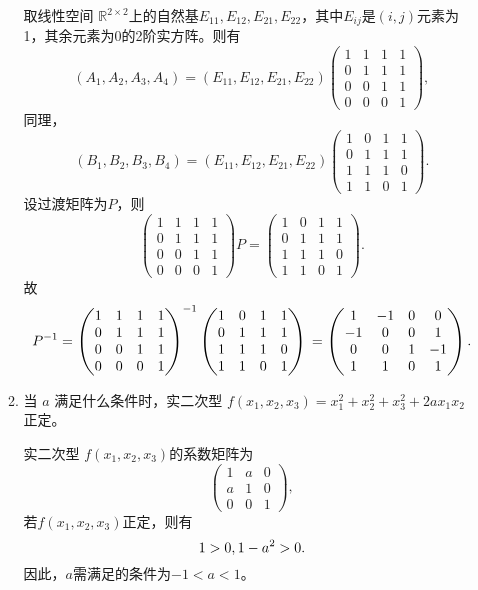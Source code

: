 \begin{enumerate}[1~]
\begin{enumerate}[1.~]
\begin{solution}
取线性空间 $\mathbb{R}^{2\times2}$上的自然基$E_{11}, E_{12}, E_{21}, E_{22}$，其中$E_{ij}$是$(i,j)$元素为1，其余元素为0的2阶实方阵。则有\[
(A_1, A_2, A_3, A_4) = (E_{11}, E_{12}, E_{21}, E_{22}) \left( \begin{matrix}
1& 1& 1& 1\\
0& 1& 1& 1\\
0& 0& 1& 1\\
0& 0& 0& 1
\end{matrix} \right),
\]
同理，\[
(B_1, B_2, B_3, B_4) = (E_{11}, E_{12}, E_{21}, E_{22}) \left( \begin{matrix}
1& 0& 1& 1\\
0& 1& 1& 1\\
1& 1& 1& 0\\
1& 1& 0& 1
\end{matrix} \right).
\]
设过渡矩阵为$P$，则\[
\left( \begin{matrix}
1& 1& 1& 1\\
0& 1& 1& 1\\
0& 0& 1& 1\\
0& 0& 0& 1
\end{matrix} \right) P = \left( \begin{matrix}
1& 0& 1& 1\\
0& 1& 1& 1\\
1& 1& 1& 0\\
1& 1& 0& 1
\end{matrix} \right).
\]
故\[
P^{-1} = \left( \begin{matrix}
1& 1& 1& 1\\
0& 1& 1& 1\\
0& 0& 1& 1\\
0& 0& 0& 1
\end{matrix} \right) ^{-1} \left( \begin{matrix}
1& 0& 1& 1\\
0& 1& 1& 1\\
1& 1& 1& 0\\
1& 1& 0& 1
\end{matrix} \right)\\
 = \left( \begin{matrix}
1& -1& 0& 0\\
-1& 0& 0& 1\\
0& 0& 1& -1\\
1& 1& 0& 1
\end{matrix} \right).
\]
\end{solution}
\item
当 $a$ 满足什么条件时，实二次型 $f(x_1, x_2, x_3) = x^2_1 + x^2_2 + x^2_3 + 2ax_1x_2$ 正定。
\begin{solution}
实二次型 $f(x_1, x_2, x_3)$的系数矩阵为
$$
\left( \begin{matrix}
1& a& 0\\
a& 1& 0\\
0& 0& 1
\end{matrix} \right),
$$
若$f(x_1, x_2, x_3)$正定，则有\[
1>0,\\
1-a^2>0.
\]
因此，$a$需满足的条件为$-1<a<1$。
\end{solution}


\end{enumerate}
\end{enumerate}

